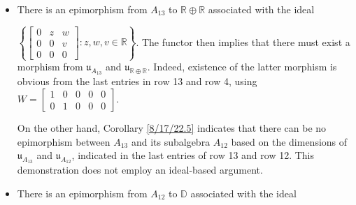 \documentclass{amsart}
\numberwithin{equation}{section}
\theoremstyle{definition}
\numberwithin{theorem}{section}
\begin{document}
\begin{itemize}
\item There is an epimorphism from $A_{13}$ to $\mathbb{R}\oplus\mathbb{R}$ associated with the ideal

 $\left\{\left[\begin{array}{ccc}
0  & z & w   \\
 0 & 0 & v \\
 0 & 0 & 0    
\end{array}\right]:z,w,v\in\mathbb{R}\right\}$. The functor then implies that there must exist a morphism from $\mathfrak{u}_{A_{13}}$ and $\mathfrak{u}_{\mathbb{R}\oplus\mathbb{R}}$.  Indeed, existence of the latter morphism is obvious from the last entries in row 13 and row 4, using $W = \left[\begin{array}{ccccc}
 1 & 0 & 0 & 0 & 0 \\ 
 0 & 1 & 0 & 0 & 0 
\end{array}\right]$.  

On the other hand, Corollary \ref{8/17/22.5} indicates that there can be no epimorphism between $A_{13}$ and its subalgebra $A_{12}$ based on the dimensions of $\mathfrak{u}_{A_{13}}$ and $\mathfrak{u}_{A_{12}}$, indicated in the last entries of row 13 and row 12.  This demonstration does not employ an ideal-based argument.
\item 
There is an epimorphism from $A_{12}$ to  $\mathbb{D}$ associated with the ideal


\end{itemize}
\end{document}
